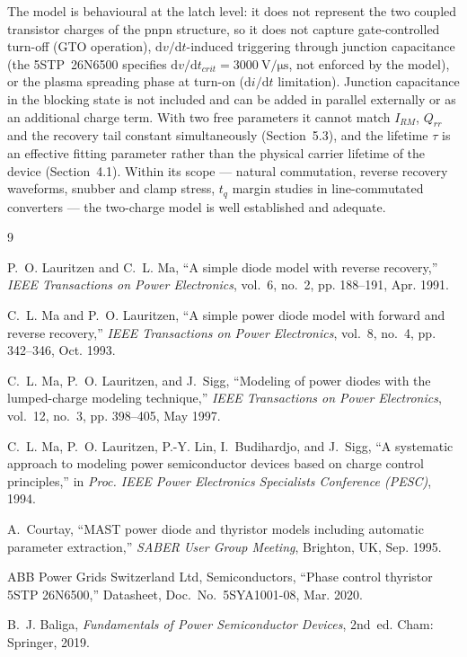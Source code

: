 \documentclass[11pt,a4paper]{article}
\begin{document}
The model is behavioural at the latch level: it does not represent the two
coupled transistor charges of the pnpn structure, so it does not capture
gate-controlled turn-off (GTO operation), $\mathrm{d}v/\mathrm{d}t$-induced
triggering through junction capacitance (the 5STP~26N6500 specifies
$\mathrm{d}v/\mathrm{d}t_{crit} = \SI{3000}{\volt\per\micro\second}$, not
enforced by the model), or the plasma spreading phase at turn-on
($\mathrm{d}i/\mathrm{d}t$ limitation). Junction capacitance in the
blocking state is not included and can be added in parallel externally or as
an additional charge term. With two free parameters it cannot match $I_{RM}$,
$Q_{rr}$ and the recovery tail constant simultaneously (Section~5.3), and the
lifetime $\tau$ is an effective fitting parameter rather than the physical
carrier lifetime of the device (Section~4.1). Within its scope --- natural commutation, reverse
recovery waveforms, snubber and clamp stress, $t_q$ margin studies in
line-commutated converters --- the two-charge model is well established and
adequate.

\begin{thebibliography}{9}

P.~O. Lauritzen and C.~L. Ma,
``A simple diode model with reverse recovery,''
\emph{IEEE Transactions on Power Electronics}, vol.~6, no.~2, pp. 188--191,
Apr. 1991.

C.~L. Ma and P.~O. Lauritzen,
``A simple power diode model with forward and reverse recovery,''
\emph{IEEE Transactions on Power Electronics}, vol.~8, no.~4, pp. 342--346,
Oct. 1993.

C.~L. Ma, P.~O. Lauritzen, and J.~Sigg,
``Modeling of power diodes with the lumped-charge modeling technique,''
\emph{IEEE Transactions on Power Electronics}, vol.~12, no.~3, pp. 398--405,
May 1997.

C.~L. Ma, P.~O. Lauritzen, P.-Y. Lin, I.~Budihardjo, and J.~Sigg,
``A systematic approach to modeling power semiconductor devices based on
charge control principles,''
in \emph{Proc. IEEE Power Electronics Specialists Conference (PESC)}, 1994.

A.~Courtay,
``MAST power diode and thyristor models including automatic parameter
extraction,''
\emph{SABER User Group Meeting}, Brighton, UK, Sep. 1995.

ABB Power Grids Switzerland Ltd, Semiconductors,
``Phase control thyristor 5STP 26N6500,''
Datasheet, Doc.\ No.\ 5SYA1001-08, Mar. 2020.

B.~J. Baliga,
\emph{Fundamentals of Power Semiconductor Devices}, 2nd~ed.
Cham: Springer, 2019.

\end{thebibliography}
\end{document}
